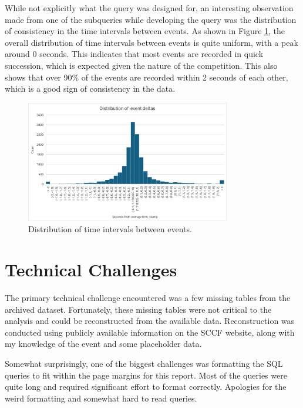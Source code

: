 \documentclass[11pt]{article}
\begin{document}
While not explicitly what the query was designed for, an interesting observation made from one of the subqueries while developing the query was the distribution of consistency in the time intervals between events. As shown in Figure \ref{fig:time_interval_distribution}, the overall distribution of time intervals between events is quite uniform, with a peak around 0 seconds. This indicates that most events are recorded in quick succession, which is expected given the nature of the competition. This also shows that over 90\% of the events are recorded within 2 seconds of each other, which is a good sign of consistency in the data.

\begin{figure}[H]
    \centering
    \includegraphics[width=0.8\textwidth]{distribution.png}
    \caption{Distribution of time intervals between events.}
    \label{fig:time_interval_distribution}
\end{figure}







\section{Technical Challenges}


The primary technical challenge encountered was a few missing tables from the archived dataset. Fortunately, these missing tables were not critical to the analysis and could be reconstructed from the available data. Reconstruction was conducted using publicly available information on the SCCF website, along with my knowledge of the event and some placeholder data.

Somewhat surprisingly, one of the biggest challenges was formatting the SQL queries to fit within the page margins for this report. Most of the queries were quite long and required significant effort to format correctly. Apologies for the weird formatting and somewhat hard to read queries.
\end{document}
